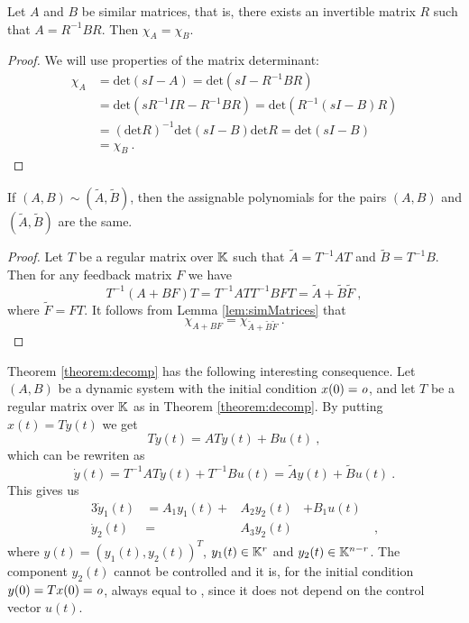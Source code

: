 \begin{lemma}
	\label{lem:simMatrices}
	Let $A$ and $B$ be similar matrices, that is, there exists an invertible matrix $R$ such that $A=R^{-1}BR$. Then $\chi_A=\chi_B$.
\end{lemma}

\begin{proof}
	We will use properties of the matrix determinant:
	\begin{align*}
		\chi_A&=\text{det}(sI-A)=\text{det}(sI-R^{-1}BR) \\
		&=\text{det}(sR^{-1}IR-R^{-1}BR)=\text{det}(R^{-1}(sI-B)R) \\
		&=(\text{det}R)^{-1}\text{det}(sI-B)\text{det}R=\text{det}(sI-B) \\
		&=\chi_B\ .
	\end{align*}
\end{proof}

\begin{lemma}
	\label{lem:simPairsAssignablePolynomial}
	If $(A,B)\sim(\widetilde{A},\widetilde{B})$, then the assignable polynomials for the pairs $(A,B)$ and $(\widetilde{A},\widetilde{B})$ are the same.
\end{lemma}

\begin{proof}
	Let $T$ be a regular matrix over $\mathbb{K}$ such that $\widetilde{A}=T^{-1}AT$ and $\widetilde{B}=T^{-1}B$. Then for any feedback matrix $F$ we have 
	$$T^{-1}(A+BF)T=T^{-1}ATT^{-1}BFT=\widetilde{A}+\widetilde{B}\widetilde{F}\ ,$$
	where $\widetilde{F}=FT$. It follows from Lemma \ref{lem:simMatrices} that $$\chi_{A+BF}=\chi_{\widetilde{A}+\widetilde{B}\widetilde{F}}\ .$$
\end{proof}

Theorem \ref{theorem:decomp} has the following interesting consequence. Let $(A,B)$ be a dynamic system with the initial condition $x(0)=\textit{o}$, and let $T$ be a regular matrix over $\mathbb{K}$ as in Theorem \ref{theorem:decomp}. By putting $x(t)=Ty(t)$ we get 
$$T\dot{y}(t)=ATy(t)+Bu(t)\ ,$$ 
which can be rewriten as 
$$\dot{y}(t)=T^{-1}ATy(t)+T^{-1}Bu(t)=\widetilde{A}y(t)+\widetilde{B}u(t)\ .$$ 
This gives us 
\begin{alignat*}{3}
	\dot{y}_1(t)&=A_1y_1(t)+&A_2y_2(t)&+B_1u(t)& \\
	\dot{y}_2(t)&=&A_3y_2(t)&&\ ,
\end{alignat*}
where $y(t)=(y_1(t),y_2(t))^T$, $y_1(t)\in\mathbb{K}^r$ and $y_2(t)\in\mathbb{K}^{n-r}$. The component $y_2(t)$ cannot be controlled and it is, for the initial condition $y(0)=Tx(0)=\textit{o}$, always equal to \nullvector, since it does not depend on the control vector $u(t)$. 

